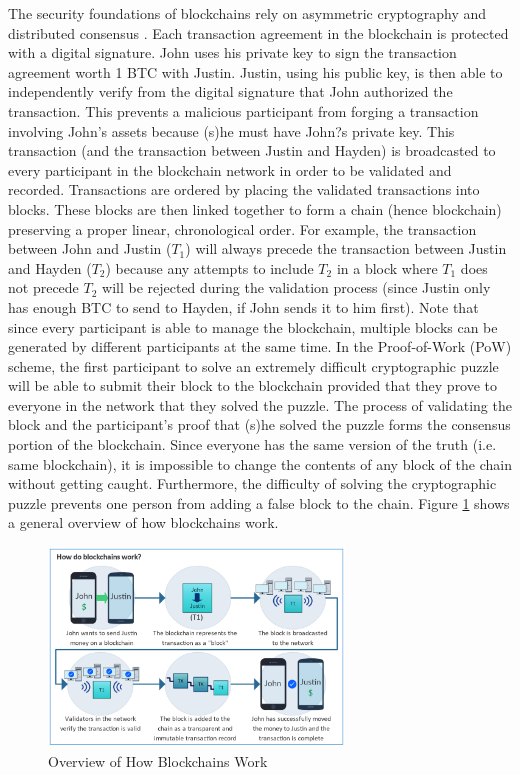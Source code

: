 The security foundations of blockchains rely on asymmetric cryptography and distributed consensus \cite{PR17}. Each transaction agreement in the blockchain is protected with a digital signature. John uses his private key to sign the transaction agreement worth 1 BTC with Justin. Justin, using his public key, is then able to independently verify from the digital signature that John authorized the transaction. This prevents a malicious participant from forging a transaction involving John's assets because (s)he must have John?s private key. This transaction (and the transaction between Justin and Hayden) is broadcasted to every participant in the blockchain network in order to be validated and recorded. Transactions are ordered by placing the validated transactions into blocks. These blocks are then linked together to form a chain (hence blockchain) preserving a proper linear, chronological order. For example, the transaction between John and Justin ($T_1$) will always precede the transaction between Justin and Hayden ($T_2$) because any attempts to include $T_2$ in a block where $T_1$ does not precede $T_2$ will be rejected during the validation process (since Justin only has enough BTC to send to Hayden, if John sends it to him first). Note that since every participant is able to manage the blockchain, multiple blocks can be generated by different participants at the same time. In the Proof-of-Work (PoW) scheme, the first participant to solve an extremely difficult cryptographic puzzle will be able to submit their block to the blockchain provided that they prove to everyone in the network that they solved the puzzle. The process of validating the block and the participant's proof that (s)he solved the puzzle forms the consensus portion of the blockchain. Since everyone has the same version of the truth (i.e. same blockchain), it is impossible to change the contents of any block of the chain without getting caught. Furthermore, the difficulty of solving the cryptographic puzzle prevents one person from adding a false block to the chain. Figure \ref{fig:btcfigure} shows a general overview of how blockchains work.
%
\begin{figure}[] %
    \centering
        \includegraphics[keepaspectratio, width=0.7\textwidth]{images/blockchains.png}
    \caption{Overview of How Blockchains Work} \label{fig:btcfigure}
\end{figure}

